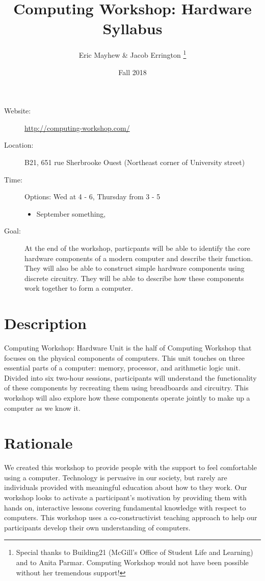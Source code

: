 \documentclass[11pt]{article}
\author{%
  Eric Mayhew \& Jacob Errington%
  \footnote{%
    Special thanks to Building21 (McGill's Office of Student Life and Learning)
    and to Anita Parmar.
    Computing Workshop would not have been possible without her tremendous
    support!
  }
}
\title{Computing Workshop: Hardware Syllabus}
\date{Fall 2018}
\begin{document}
\maketitle

\begin{description}
  \item[Website:]
    \url{http://computing-workshop.com/}

  \item[Location:]
    B21, 651 rue Sherbrooke Ouest
    (Northeast corner of University street)

  \item[Time:]
    Options: Wed at 4 - 6, Thursday from 3 - 5
    \begin{itemize}
      \item September something,
    \end{itemize}

  \item[Goal:]
    At the end of the workshop, particpants will be able to identify the core
    hardware components of a modern computer and describe their function.
    They will also be able to construct simple hardware components using discrete
    circuitry.
    They will be able to describe how these components work together to form
    a computer.
\end{description}

\section*{Description}

Computing Workshop: Hardware Unit is the half of Computing Workshop that focuses
on the physical components of computers. This unit touches on three essential
parts of a computer: memory, processor, and arithmetic logic unit.
Divided into six two-hour sessions, participants will understand the
functionality of these components by recreating them using breadboards and
circuitry.
This workshop will also explore how these components operate jointly to make up
a computer as we know it.

\section*{Rationale}

We created this workshop to provide people with the support to feel comfortable
using a computer. Technology is pervasive in our society, but rarely are
individuals provided with meaningful education about how to they work. Our workshop
looks to activate a participant's motivation by providing them with hands on,
interactive lessons covering fundamental knowledge with respect to computers.
This workshop uses a co-constructivist teaching approach to help our
participants develop their own understanding of computers.
\end{document}
